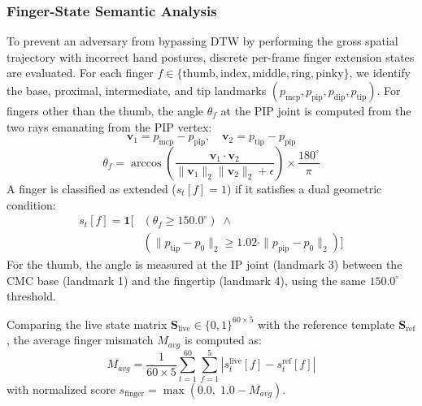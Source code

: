 \documentclass[conference]{IEEEtran}
\begin{document}
\subsubsection{Finger-State Semantic Analysis}
To prevent an adversary from bypassing DTW by performing the gross spatial trajectory with incorrect hand postures, discrete per-frame finger extension states are evaluated. For each finger $f \in \{\text{thumb}, \text{index}, \text{middle}, \text{ring}, \text{pinky}\}$, we identify the base, proximal, intermediate, and tip landmarks $(p_{\text{mcp}}, p_{\text{pip}}, p_{\text{dip}}, p_{\text{tip}})$. For fingers other than the thumb, the angle $\theta_f$ at the PIP joint is computed from the two rays emanating from the PIP vertex:
\begin{equation}
\mathbf{v}_1 = p_{\text{mcp}} - p_{\text{pip}}, \quad \mathbf{v}_2 = p_{\text{tip}} - p_{\text{pip}}
\end{equation}
\begin{equation}
\theta_f = \arccos\left( \frac{\mathbf{v}_1 \cdot \mathbf{v}_2}{\|\mathbf{v}_1\|_2 \|\mathbf{v}_2\|_2 + \epsilon} \right) \times \frac{180^\circ}{\pi}
\end{equation}
A finger is classified as extended ($s_t[f] = 1$) if it satisfies a dual geometric condition:
\begin{equation}
\begin{split}
s_t[f] = \mathbf{1}\big[ &(\theta_f \ge 150.0^\circ) \;\wedge \\
&(\|p_{\text{tip}} - p_0\|_2 \ge 1.02 \cdot \|p_{\text{pip}} - p_0\|_2)\big]
\end{split}
\label{eq:finger_state}
\end{equation}
For the thumb, the angle is measured at the IP joint (landmark 3) between the CMC base (landmark 1) and the fingertip (landmark 4), using the same $150.0^\circ$ threshold.

Comparing the live state matrix $\mathbf{S}_{\text{live}} \in \{0, 1\}^{60 \times 5}$ with the reference template $\mathbf{S}_{\text{ref}}$, the average finger mismatch $M_{avg}$ is computed as:
\begin{equation}
M_{avg} = \frac{1}{60 \times 5} \sum_{t=1}^{60} \sum_{f=1}^{5} |s_t^{\text{live}}[f] - s_t^{\text{ref}}[f]|
\end{equation}
with normalized score $s_{\text{finger}} = \max(0.0,\; 1.0 - M_{avg})$.
\end{document}
